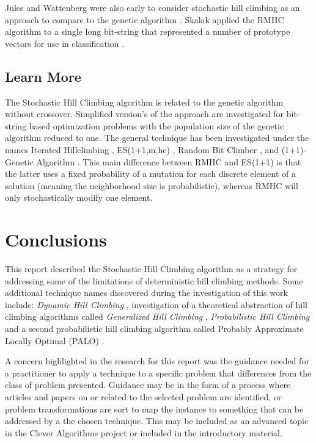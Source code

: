\documentclass[a4paper, 11pt]{article}
\begin{document}
Jules and Wattenberg were also early to consider stochastic hill climbing as an approach to compare to the genetic algorithm \cite{Juels1994}.
Skalak applied the RMHC algorithm to a single long bit-string that represented a number of prototype vectors for use in classification \cite{Skalak1994}.

% 
% 
\subsection{Learn More}
The Stochastic Hill Climbing algorithm is related to the genetic algorithm without crossover. Simplified version's of the approach are investigated for bit-string based optimization problems with the population size of the genetic algorithm reduced to one. The general technique has been investigated under the names Iterated Hillclimbing \cite{Muhlenbein1991}, ES(1+1,m,hc) \cite{Muhlenbein1992}, Random Bit Climber \cite{Davis1991}, and (1+1)-Genetic Algorithm \cite{Back1993}. This main difference between RMHC and ES(1+1) is that the latter uses a fixed probability of a mutation for each discrete element of a solution (meaning the neighborhood size is probabilistic), whereas RMHC will only stochastically modify one element.

% 
% 
\section{Conclusions}
\label{sec:conclusions}
This report described the Stochastic Hill Climbing algorithm as a strategy for addressing some of the limitations of deterministic hill climbing methods.
Some additional technique names discovered during the investigation of this work include: \emph{Dynamic Hill Climbing} \cite{Yuret1993}, investigation of a theoretical abstraction of hill climbing algorithms called \emph{Generalized Hill Climbing} \cite{Johnson2002, Sullivan2001}, \emph{Probabilistic Hill Climbing} \cite{Romeo1984} and a second probabilistic hill climbing algorithm called Probably Approximate Locally Optimal (PALO) \cite{Cohen1994}.

A concern highlighted in the research for this report was the guidance needed for a practitioner to apply a technique to a specific problem that differences from the class of problem presented. Guidance may be in the form of a process where articles and papers on or related to the selected problem are identified, or problem transformations are sort to map the instance to something that can be addressed by a the chosen technique. This may be included as an advanced topic in the Clever Algorithms project or included in the introductory material.
\end{document}
